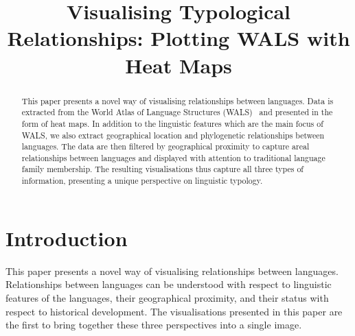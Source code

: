 \documentclass[11pt]{article}
\title{Visualising Typological Relationships: Plotting WALS with Heat Maps}
\date{}
\begin{document}
\maketitle


\begin{abstract}
This paper presents a novel way of visualising relationships between languages. Data is extracted from the World Atlas of Language Structures (WALS)~\cite{wals-2011} and presented in the form of heat maps. In addition to the linguistic features which are the main focus of WALS, we also extract geographical location and phylogenetic relationships between languages. The data are then filtered by geographical proximity to capture areal relationships between languages and displayed with attention to traditional language family membership. The resulting visualisations thus capture all three types of information, presenting a unique perspective on linguistic typology.
\end{abstract}


\section{Introduction}

This paper presents a novel way of visualising relationships between languages. Relationships between languages can be understood with respect to linguistic features of the languages, their geographical proximity, and their status with respect to historical development. The visualisations presented in this paper are the first to bring together these three perspectives into a single image.
\end{document}
